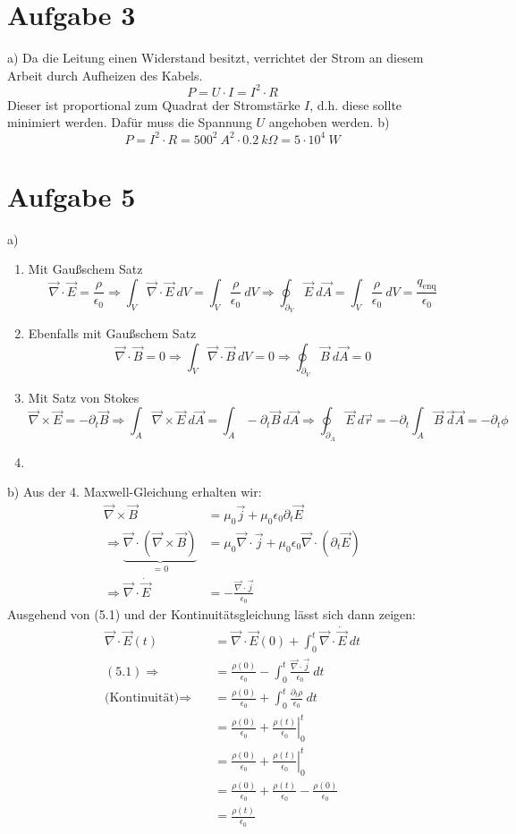 \documentclass[11pt a4paper]{article}
\newcommand{\delt}{\partial_t}
\newcommand{\epsz}{\epsilon_0}
\newcommand{\diver}{\vec \nabla \cdot}
\newcommand{\rot}{\vec \nabla \times}
\begin{document}
\newpage

\section*{Aufgabe 3}
a) Da die Leitung einen Widerstand besitzt, verrichtet der Strom an diesem Arbeit durch Aufheizen des Kabels.
\[ P = U \cdot I = I^2 \cdot R \]
Dieser ist proportional zum Quadrat der Stromstärke $I$, d.h. diese sollte minimiert werden. Dafür muss die 
Spannung $U$ angehoben werden.
b)
\[
	P = I^2 \cdot R = 500^2 \ A^2 \cdot 0.2 \ k\Omega = 5 \cdot 10^4 \ W
\]

\newpage

\section*{Aufgabe 5}
a) 
\begin{enumerate}
	\item Mit Gaußschem Satz
	\[ 
		\diver \vec E = \frac{\rho}{\epsz} 
		\Rightarrow
		\int_V \diver \vec E \ dV = \int_V \frac{\rho}{\epsz} \ dV 
		\Rightarrow
		\oint_{\partial_V} \vec E \ d\vec A = \int_V \frac{\rho}{\epsz} \ dV 
		= \frac{q_\text{enq}}{\epsz}
	\]
	\item Ebenfalls mit Gaußschem Satz
	\[
		\diver \vec B = 0
		\Rightarrow
		\int_V \diver \vec B \ dV = 0
		\Rightarrow
		\oint_{\partial_V} \vec B \ d\vec A = 0
	\]
	\item Mit Satz von Stokes
	\[
		\rot \vec E = -\delt \vec B
		\Rightarrow
		\int_A \rot \vec E \ d\vec A = \int_A -\delt \vec B \ d\vec A
		\Rightarrow
		\oint_{\partial_A} \vec E \ d\vec r = -\delt \int_A \vec B \ \vec d\vec A = -\delt \phi
	\]
	\item 
\end{enumerate}
b) Aus der 4. Maxwell-Gleichung erhalten wir:
\begin{align*}
	\rot \vec B 
	&= \mu_0 \vec j + \mu_0 \epsz \delt \vec E \\
	\Rightarrow
	\underbrace{\diver \left(\rot \vec B \right)}_{=0}
	&= \mu_0 \diver \vec j + \mu_0 \epsz \diver \left( \delt \vec E \right) \\
	\Rightarrow
	\diver \dot{\vec E}
	&= - \frac{\diver \vec j}{\epsz} \tag{5.1}
\end{align*}
Ausgehend von (5.1) und der Kontinuitätsgleichung lässt sich dann zeigen:
\begin{align*}
	\diver \vec E(t) 
	&= \diver \vec E(0) + \int_0^t \diver \dot{\vec E} \ dt \\
	(5.1) \Rightarrow \quad
	&= \frac{\rho(0)}{\epsz} - \int_0^t \frac{\diver \vec j}{\epsz} \ dt \\
	\text{(Kontinuität)} \Rightarrow \quad
	&= \frac{\rho(0)}{\epsz} + \int_0^t \frac{\delt \rho}{\epsz} \ dt \\
	&= \frac{\rho(0)}{\epsz} + \left. \frac{\rho(t)}{\epsz} \right|_0^t \\
	&= \frac{\rho(0)}{\epsz} + \left. \frac{\rho(t)}{\epsz} \right|_0^t \\
	&= \frac{\rho(0)}{\epsz} + \frac{\rho(t)}{\epsz} - \frac{\rho(0)}{\epsz} \\
	&= \frac{\rho(t)}{\epsz}
\end{align*}
\end{document}
